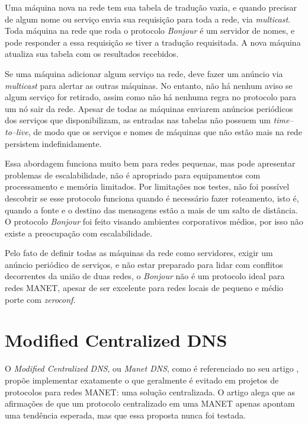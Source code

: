        Uma máquina nova na rede tem sua tabela de tradução vazia, e quando 
        precisar de algum nome ou serviço envia sua requisição para toda a rede,
        via \textit{multicast}. Toda máquina na rede que roda o protocolo
        \textit{Bonjour} é um servidor de nomes, e pode responder a essa 
        requisição se tiver a tradução requisitada. A nova máquina atualiza sua 
        tabela com os resultados recebidos.

        Se uma máquina adicionar algum serviço na rede, deve fazer um anúncio via
        \textit{multicast} para alertar as outras máquinas. No entanto, não há 
        nenhum aviso se algum serviço for retirado, assim como não há nenhuma 
        regra no protocolo para um nó sair da rede. Apesar de todas as máquinas 
        enviarem anúncios periódicos dos serviços que disponibilizam, as entradas
        nas tabelas não possuem um \textit{time--to--live}, de modo que os serviços
        e nomes de máquinas que não estão mais na rede persistem indefinidamente.

        Essa abordagem funciona muito bem para redes pequenas, mas pode apresentar
        problemas de escalabilidade, não é apropriado para equipamentos com 
        processamento e memória limitados. Por limitações nos testes, não foi possível
        descobrir se esse protocolo funciona quando é necessário fazer roteamento,
        isto é, quando a fonte e o destino das mensagens estão a mais de um salto
        de distância. O protocolo \textit{Bonjour} foi feito visando ambientes 
        corporativos médios, por isso não existe a preocupação com escalabilidade.
        
        Pelo fato de definir todas as máquinas da rede como servidores, exigir um
        anúncio periódico de serviços, e não estar preparado para lidar com conflitos
        decorrentes da união de duas redes, o \textit{Bonjour} não é um protocolo
        ideal para redes MANET, apesar de ser excelente para redes locais de pequeno
        e médio porte com \textit{zeroconf}.


\section{Modified Centralized DNS}
\label{MCDNS}

    O \textit{Modified Centralized DNS}, ou \textit{Manet DNS}, como é referenciado
    no seu artigo \cite{mcdns}, propõe implementar exatamente o que geralmente é
    evitado em projetos de protocolos para redes MANET: uma solução centralizada.
    O artigo alega que as afirmações de que um protocolo centralizado em uma MANET
    apenas apontam uma tendência esperada, mas que essa proposta nunca foi testada.
  
